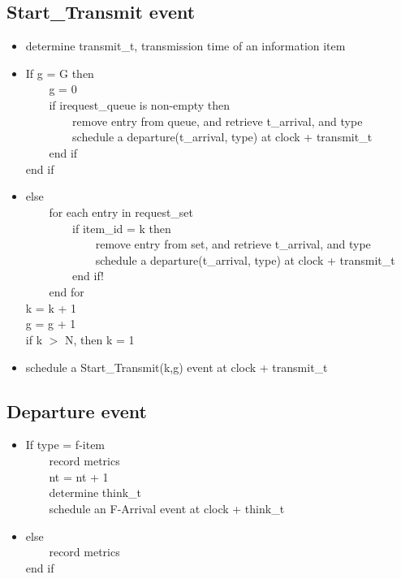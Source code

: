 \documentclass[12pt]{article}
\begin{document}
\subsection{Start\_Transmit event}
\begin{itemize}
\setlength{\itemsep}{-3mm}
\item determine transmit\_t, transmission time of an information item
\item If g = G then\\
\verb!    !g = 0\\
\verb!    !if irequest\_queue is non-empty then\\
\verb!        !remove entry from queue, and retrieve t\_arrival, and type\\
\verb!        !schedule a departure(t\_arrival, type) at clock + transmit\_t\\
\verb!    !end if\\
end if
\item else\\
\verb!    !for each entry in request\_set\\
\verb!        !if item\_id = k then\\
\verb!            !remove entry from set, and retrieve t\_arrival, and type\\
\verb!            !schedule a departure(t\_arrival, type) at clock +
transmit\_t\\
\verb!        !end if!\\
\verb!    !end for\\
k = k + 1\\
g = g + 1\\
if k $>$ N, then k = 1
\item schedule a Start\_Transmit(k,g) event at clock + transmit\_t
\end{itemize}

\subsection{Departure event}
\begin{itemize}
\setlength{\itemsep}{-3mm}
\item If type = f-item\\
\verb!    !record metrics\\
\verb!    !nt = nt + 1\\
\verb!    !determine think\_t\\
\verb!    !schedule an F-Arrival event at clock + think\_t
\item else\\
\verb!    !record metrics\\
end if
\end{itemize}
\end{document}
